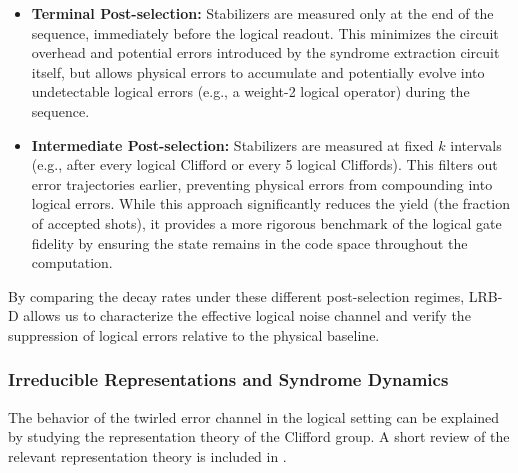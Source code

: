\begin{itemize}
    \item \textbf{Terminal Post-selection:} Stabilizers are measured only at the end of the sequence, immediately before the logical readout. This minimizes the circuit overhead and potential errors introduced by the syndrome extraction circuit itself, but allows physical errors to accumulate and potentially evolve into undetectable logical errors (e.g., a weight-2 logical operator) during the sequence.
    
    \item \textbf{Intermediate Post-selection:} Stabilizers are measured at fixed $k$ intervals (e.g., after every logical Clifford or every 5 logical Cliffords). This filters out error trajectories earlier, preventing physical errors from compounding into logical errors. While this approach significantly reduces the yield (the fraction of accepted shots), it provides a more rigorous benchmark of the logical gate fidelity by ensuring the state remains in the code space throughout the computation.
\end{itemize}

By comparing the decay rates under these different post-selection regimes, LRB-D allows us to characterize the effective logical noise channel and verify the suppression of logical errors relative to the physical baseline.


\subsubsection{Irreducible Representations and Syndrome Dynamics}
\label{sub:irreps}

The behavior of the twirled error channel in the logical setting can be explained by studying the representation theory of the Clifford group.
A short review of the relevant representation theory is included in .

